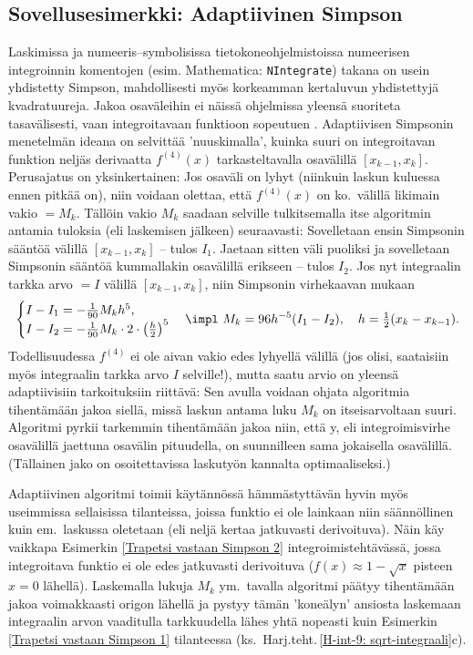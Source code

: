 \subsection{Sovellusesimerkki: Adaptiivinen Simpson}

Laskimissa ja numeeris--symbolisissa tietokoneohjelmistoissa numeerisen integroinnin komentojen
(esim. Mathematica: \verb|NIntegrate|) takana on usein yhdistetty Simpson, mahdollisesti myös
korkeamman kertaluvun yhdistettyjä kvadratuureja. Jakoa osaväleihin ei näissä ohjelmissa
yleensä suoriteta tasavälisesti, vaan integroitavaan funktioon sopeutuen . 
Adaptiivisen Simpsonin menetelmän ideana on selvittää 'nuuskimalla', kuinka suuri on 
integroitavan funktion neljäs derivaatta $f^{(4)}(x)$ tarkasteltavalla osavälillä 
$[x_{k-1},x_k]$. Perusajatus on yksinkertainen: Jos osaväli on lyhyt (niinkuin laskun kuluessa
ennen pitkää on), niin voidaan olettaa, että $f^{(4)}(x)$ on ko.\ välillä likimain vakio $=M_k$.
Tällöin vakio $M_k$ saadaan selville tulkitsemalla itse algoritmin antamia tuloksia 
%
 (eli laskemisen jälkeen) seuraavasti: Sovelletaan ensin Simpsonin sääntöä
välillä $[x_{k-1},x_k]$ -- tulos $I_1$. Jaetaan sitten väli puoliksi ja sovelletaan Simpsonin
sääntöä kummallakin osavälillä erikseen -- tulos $I_2$. Jos nyt integraalin tarkka arvo $=I$ 
välillä $[x_{k-1},x_k]$, niin Simpsonin virhekaavan mukaan
\[
\begin{cases} 
 I-I_1=-\frac{1}{90}M_kh^5, \\ 
 I-I_2=-\frac{1}{90}M_k\cdot 2\cdot\left(\frac{h}{2}\right)^5
\end{cases}
\impl\ M_k=96h^{-5}(I_1-I_2), \quad h=\tfrac{1}{2}(x_k-x_{k-1}).
\]
Todellisuudessa $f^{(4)}$ ei ole aivan vakio edes lyhyellä välillä (jos olisi, saataisiin myös
integraalin tarkka arvo $I$ selville!), mutta saatu arvio on yleensä adaptiivisiin 
tarkoituksiin riittävä: Sen avulla voidaan ohjata algoritmia tihentämään jakoa siellä, missä 
laskun antama luku $M_k$ on itseisarvoltaan suuri. Algoritmi pyrkii tarkemmin tihentämään jakoa
niin, että y, eli integroimisvirhe osavälillä jaettuna osavälin 
pituudella, on suunnilleen sama jokaisella osavälillä. (Tällainen jako on osoitettavissa 
laskutyön kannalta optimaaliseksi.) 

Adaptiivinen algoritmi toimii käytännössä hämmästyttävän hyvin myös useimmissa sellaisissa
tilanteissa, joissa funktio ei ole lainkaan niin säännöllinen kuin em.\ laskussa oletetaan
(eli neljä kertaa jatkuvasti derivoituva). Näin käy vaikkapa Esimerkin 
\ref{Trapetsi vastaan Simpson 2} integroimistehtävässä, jossa integroitava funktio ei ole
edes jatkuvasti derivoituva ($f(x) \approx 1-\sqrt{x}$ pisteen $x=0$ lähellä). Laskemalla
lukuja $M_k$ ym.\ tavalla algoritmi päätyy tihentämään jakoa voimakkaasti origon lähellä
ja pystyy tämän 'koneälyn' ansiosta laskemaan integraalin arvon vaaditulla tarkkuudella lähes
yhtä nopeasti kuin Esimerkin \ref{Trapetsi vastaan Simpson 1} tilanteessa 
(ks.\ Harj.teht.\,\ref{H-int-9: sqrt-integraali}c).

